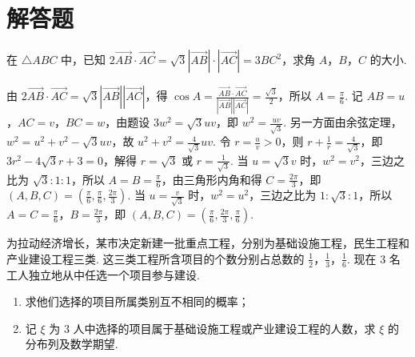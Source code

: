 \section{解答题}

\begin{problem}
在 \(\triangle ABC\) 中，已知 \(2\overrightarrow{AB} \cdot \overrightarrow{AC} = \sqrt{3} |\overrightarrow{AB}| \cdot |\overrightarrow{AC}| = 3BC^2\)，求角 \(A\)，\(B\)，\(C\) 的大小.
\end{problem}

\begin{solution}
由 \(2\overrightarrow{AB}\cdot\overrightarrow{AC}=\sqrt3|\overrightarrow{AB}||\overrightarrow{AC}|\)，得 \(\cos A=\frac{\overrightarrow{AB}\cdot\overrightarrow{AC}}{|\overrightarrow{AB}||\overrightarrow{AC}|}=\frac{\sqrt3}{2}\)，所以 \(A=\frac{\pi}{6}\). 记 \(AB=u\)，\(AC=v\)，\(BC=w\)，由题设 \(3w^2=\sqrt3uv\)，即 \(w^2=\frac{uv}{\sqrt3}\). 另一方面由余弦定理，\(w^2=u^2+v^2-\sqrt3uv\)，故 \(u^2+v^2=\frac4{\sqrt3}uv\). 令 \(r=\frac uv>0\)，则 \(r+\frac1r=\frac4{\sqrt3}\)，即 \(3r^2-4\sqrt3r+3=0\)，解得 \(r=\sqrt3\) 或 \(r=\frac1{\sqrt3}\). 当 \(u=\sqrt3v\) 时，\(w^2=v^2\)，三边之比为 \(\sqrt3:1:1\)，所以 \(A=B=\frac{\pi}{6}\)，由三角形内角和得 \(C=\frac{2\pi}{3}\)，即 \((A,B,C)=\left(\frac{\pi}{6},\frac{\pi}{6},\frac{2\pi}{3}\right)\). 当 \(u=\frac{v}{\sqrt3}\) 时，\(w^2=u^2\)，三边之比为 \(1:\sqrt3:1\)，所以 \(A=C=\frac{\pi}{6}\)，\(B=\frac{2\pi}{3}\)，即 \((A,B,C)=\left(\frac{\pi}{6},\frac{2\pi}{3},\frac{\pi}{6}\right)\).
\end{solution}

\begin{problem}
为拉动经济增长，某市决定新建一批重点工程，分别为基础设施工程，民生工程和产业建设工程三类. 这三类工程所含项目的个数分别占总数的 \(\frac{1}{2}\)，\(\frac{1}{3}\)，\(\frac{1}{6}\). 现在 \(3\) 名工人独立地从中任选一个项目参与建设.
\begin{enumerate}
\item 求他们选择的项目所属类别互不相同的概率；
\item 记 \( \xi \) 为 \(3\) 人中选择的项目属于基础设施工程或产业建设工程的人数，求 \( \xi \) 的分布列及数学期望.
\end{enumerate}
\end{problem}

